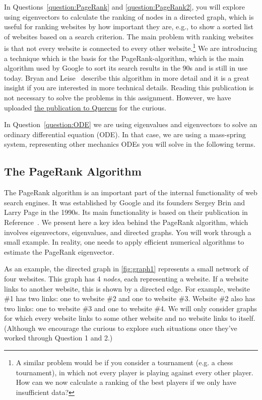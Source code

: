 \documentclass[10pt,answers]{exam}
\begin{document}
In Questions~\ref{question:PageRank} and \ref{question:PageRank2}, you will
explore using eigenvectors to calculate the ranking of nodes in a directed
graph, which is useful for ranking websites by how important they are, e.g., to
show a sorted list of websites based on a search criterion. The main problem
with ranking websites is that not every website is connected to every other
website.\footnote{A similar problem would be if you consider a tournament
  (e.g. a chess tournament), in which not every player is playing against every
  other player. How can we now calculate a ranking of the best players if we
  only have insufficient data?}  We are introducing a technique which is the
basis for the PageRank-algorithm, which is the main algorithm used by Google to
sort its search results in the 90s and is still in use today. Bryan and
Leise~\cite{Bryan2006} describe this algorithm in more detail and it is a great
insight if you are interested in more technical details. Reading this
publication is not necessary to solve the problems in this assignment. However,
we have uploaded
\href{https://q.utoronto.ca/courses/375036/modules/items/6183944}{the
  publication to Quercus} for the curious.

\vspace{.2cm}

In Question~\ref{question:ODE} we are using eigenvalues and eigenvectors to
solve an ordinary differential equation (ODE). In that case, we are using a
mass-spring system, representing other mechanics ODEs you will solve in the
following terms.

\subsection*{The PageRank Algorithm}
The PageRank algorithm is an important part of the internal functionality of web
search engines. It was established by Google and its founders Sergey Brin and
Larry Page in the 1990s. Its main functionality is based on their publication in
Reference~\cite{Brin1998}. We present here a key idea behind the PageRank
algorithm, which involves eigenvectors, eigenvalues, and directed graphs.  You
will work through a small example.  In reality, one needs to apply efficient
numerical algorithms to estimate the PageRank eigenvector.

\vspace{.2cm}

As an example, the directed graph in \cref{fig:graph1} represents a small
network of four websites. This graph has 4 \textit{nodes}, each representing a
website. If a website links to another website, this is shown by a directed
edge.  For example, website \#1 has two links: one to website \#2 and one to
website \#3.  Website \#2 also has two links: one to website \#3 and one to
website \#4.  We will only consider graphs for which every website links to some
other website and no website links to itself. (Although we encourage the curious
to explore such situations once they've worked through Question 1 and 2.)
\end{document}
